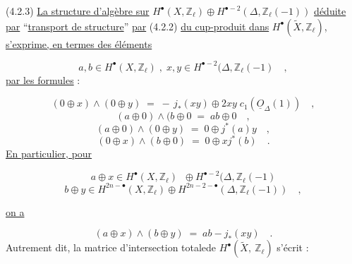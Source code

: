 (4.2.3) \underline{La structure d'algèbre sur} $H^{\bullet}(X,\mathbb{Z}_{\ell}) \oplus H^{\bullet-2}(\Delta,\mathbb{Z}_{\ell}(-1))$ \underline{déduite par} ``\underline{transport de structure}'' \underline{par} (4.2.2) \underline{du cup-produit dans} $H^{\bullet}(\widetilde{X},\mathbb{Z}_{\ell})$, \underline{s'exprime, en termes des éléments}

\begin{equation*}
a,b \in H^{\bullet}(X,\mathbb{Z}_{\ell}) \;,\; x,y \in H^{\bullet-2}(\Delta,\mathbb{Z}_{\ell}(-1) \quad ,
\end{equation*}
\underline{par les formules} :

\begin{equation}\tag{4.2.3.1}
(0 \oplus x) \wedge (0 \oplus y) \;=\; -\, j_{*}(xy) \oplus 2xy \; c_{1}(\underline{O}_{\Delta}(1)) \quad ,
\end{equation}
\begin{equation}\tag{4.2.3.2}
(a \oplus 0) \wedge (b \oplus 0 \;=\; ab \oplus 0 \quad ,
\end{equation}
\begin{equation}\tag{4.2.3.3}
(a \oplus 0) \wedge (0 \oplus y) \;=\; 0 \oplus j^{*}(a)y \quad ,
\end{equation}
\begin{equation}\tag{4.2.3.4}
(0 \oplus x) \wedge (b \oplus 0) \;=\; 0 \oplus xj^{*}(b) \quad .
\end{equation}
\underline{En particulier, pour}

\begin{equation*}
a \oplus x \in H^{\bullet}(X,\mathbb{Z}_{\ell}) \;\; \oplus H^{\bullet-2}(\Delta,\mathbb{Z}_{\ell}(-1)
\end{equation*}
\begin{equation*}
b \oplus y \in H^{2n-\bullet}(X,\mathbb{Z}_{\ell}) \oplus H^{2n-2-\bullet}(\Delta,\mathbb{Z}_{\ell}(-1)) \quad , 
\end{equation*}


 \underline{on a}

\begin{equation}\tag{4.2.3.5}
(a \oplus x) \wedge (b \oplus y) \;=\; ab - j_{*}(xy) \quad .
\end{equation}
Autrement dit, la matrice d'intersection totalede $H^{\bullet}(\widetilde{X},\ \mathbb{Z}_{\ell})$ s'écrit :

